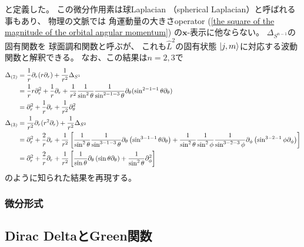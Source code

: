 と定義した。
この微分作用素は球Laplacian
（spherical Laplacian）と呼ばれる事もあり、
物理の文脈では
角運動量の大きさoperator
(\ref{the square of the magnitude of the orbital angular momentum})
の$\bm{x}$-表示に他ならない。
$\Delta_{S^{n-1}}$の固有関数を
球面調和関数と呼ぶが、
これも$\hat{L}^2$の固有状態
$\ket{j, m}$に対応する波動関数と解釈できる。
なお、この結果は$n = 2,3$で
\begin{align}
    \Delta_{(2)}
    &=
    \dfrac{1}{r}
        \partial_r
        (r \partial_r)
    +
    \dfrac{1}{r^2}
    \Delta_{S^1}
\notag\\&
=
    \dfrac{1}{r}
        r \partial_r^2
    +
    \dfrac{1}{r}
        \partial_r
    +
    \dfrac{1}{r^2}
    \dfrac{1}{\sin^2 \theta}
    \dfrac{1}{\sin^{2-1-3} \theta}
    \partial_\theta
    (\sin^{2-1-1} \theta \partial_\theta)
\notag\\&
=
        \partial_r^2
    +
        \dfrac{1}{r}
        \partial_r
    +
    \dfrac{1}{r^2}
    \partial_\theta^2
\\
    \Delta_{(3)}
    &=
    \dfrac{1}{r^2}
        \partial_r
        (r^2 \partial_r)
    +
    \dfrac{1}{r^2}
    \Delta_{S^2}
\notag\\&
=
    \partial_r^2
    +
    \dfrac{2}{r}
        \partial_r
    +
    \dfrac{1}{r^2}
    \left[
        \dfrac{1}{\sin^2 \theta}
        \dfrac{1}{\sin^{3-1-3} \theta}
        \partial_\theta
        \left(
            \sin^{3-1-1} \theta
            \partial_\theta
        \right)
    +
        \dfrac{1}{\sin^2 \theta}
        \dfrac{1}{\sin^2 \phi}
        \dfrac{1}{\sin^{3-2-3} \phi}
        \partial_\phi
        \left(
            \sin^{3-2-1} \phi
            \partial_\phi
        \right)
    \right]
\notag\\&
=
    \partial_r^2
    +
    \dfrac{2}{r}
        \partial_r
    +
    \dfrac{1}{r^2}
    \left[
        \dfrac{1}{\sin \theta}
        \partial_\theta
        \left(
            \sin \theta
            \partial_\theta
        \right)
    +
        \dfrac{1}{\sin^2 \theta}
        \partial_\phi^2
    \right]
\end{align}
のように知られた結果を再現する。

\subsubsection{微分形式}

\newpage
\subsection{Dirac DeltaとGreen関数}

